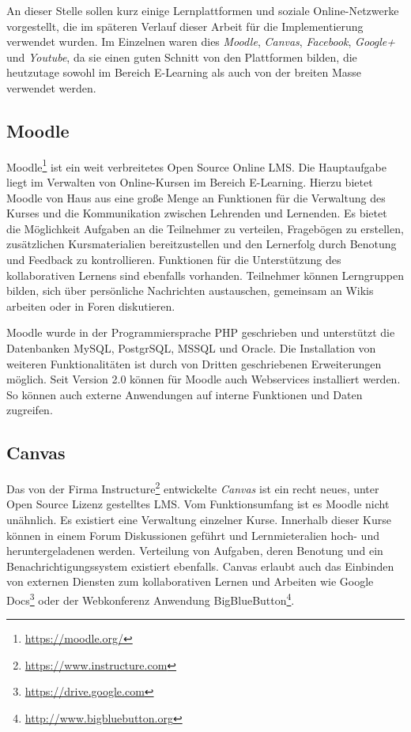 An dieser Stelle sollen kurz einige Lernplattformen und soziale Online-Netzwerke vorgestellt, die im späteren Verlauf dieser Arbeit für die Implementierung verwendet wurden. Im Einzelnen waren dies \emph{Moodle}, \emph{Canvas}, \emph{Facebook}, \emph{Google+} und \emph{Youtube}, da sie einen guten Schnitt von den Plattformen bilden, die heutzutage sowohl im Bereich E-Learning als auch von der breiten Masse verwendet werden.

\subsection{Moodle} %
\label{sub:moodle}

Moodle\footnote{\url{https://moodle.org/}} ist ein weit verbreitetes Open Source Online LMS. Die Hauptaufgabe liegt im Verwalten von Online-Kursen im Bereich E-Learning. Hierzu bietet Moodle von Haus aus eine große Menge an Funktionen für die Verwaltung des Kurses und die Kommunikation zwischen Lehrenden und Lernenden. Es bietet die Möglichkeit Aufgaben an die Teilnehmer zu verteilen, Fragebögen zu erstellen, zusätzlichen Kursmaterialien bereitzustellen und den Lernerfolg durch Benotung und Feedback zu kontrollieren. Funktionen für die Unterstützung des kollaborativen Lernens sind ebenfalls vorhanden. Teilnehmer können Lerngruppen bilden, sich über persönliche Nachrichten austauschen, gemeinsam an Wikis arbeiten oder in Foren diskutieren. 

Moodle wurde in der Programmiersprache PHP geschrieben und unterstützt die  Datenbanken MySQL, PostgrSQL, MSSQL und Oracle. Die Installation von weiteren Funktionalitäten ist durch von Dritten geschriebenen Erweiterungen möglich. Seit Version 2.0 können für Moodle auch Webservices installiert werden. So können auch externe Anwendungen auf interne Funktionen und Daten zugreifen.


\subsection{Canvas} %
\label{sub:canvas}

Das von der Firma Instructure\footnote{\url{https://www.instructure.com}} entwickelte \emph{Canvas} ist ein recht neues, unter Open Source Lizenz gestelltes LMS. Vom Funktionsumfang ist es Moodle nicht unähnlich. Es existiert eine Verwaltung einzelner Kurse. Innerhalb dieser Kurse können in einem Forum Diskussionen geführt und Lernmieteralien hoch- und heruntergeladenen werden. Verteilung von Aufgaben, deren Benotung und ein Benachrichtigungssystem existiert ebenfalls. Canvas erlaubt auch das Einbinden von externen Diensten zum kollaborativen Lernen und Arbeiten wie Google Docs\footnote{\url{https://drive.google.com}} oder der Webkonferenz Anwendung BigBlueButton\footnote{\url{http://www.bigbluebutton.org}}.

